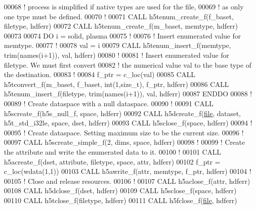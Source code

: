 \begin{DoxyCode}
00068   \textcolor{comment}{! process is simplified if native types are used for the file,}
00069   \textcolor{comment}{! as only one type must be defined.}
00070   \textcolor{comment}{!}
00071   \textcolor{keyword}{CALL }h5tenum\_create\_f(f\_baset, filetype, hdferr)
00072   \textcolor{keyword}{CALL }h5tenum\_create\_f(m\_baset, memtype, hdferr)
00073 
00074   \textcolor{keywordflow}{DO} i = solid, plasma
00075      \textcolor{comment}{!}
00076      \textcolor{comment}{! Insert enumerated value for memtype.}
00077      \textcolor{comment}{!}
00078      val = i
00079      \textcolor{keyword}{CALL }h5tenum\_insert\_f(memtype, trim(names(i+1)), val, hdferr)
00080      \textcolor{comment}{!}
00081      \textcolor{comment}{! Insert enumerated value for filetype.  We must first convert}
00082      \textcolor{comment}{! the numerical value val to the base type of the destination.}
00083      \textcolor{comment}{!}
00084      f\_ptr = c\_loc(val)
00085      \textcolor{keyword}{CALL }h5tconvert\_f(m\_baset, f\_baset, int(1,size\_t), f\_ptr, hdferr)
00086      \textcolor{keyword}{CALL }h5tenum\_insert\_f(filetype, trim(names(i+1)), val, hdferr)
00087 \textcolor{keywordflow}{  ENDDO}
00088   \textcolor{comment}{!}
00089   \textcolor{comment}{! Create dataspace with a null dataspace.}
00090   \textcolor{comment}{!}
00091   \textcolor{keyword}{CALL }h5screate\_f(h5s\_null\_f, space, hdferr)
00092   \textcolor{keyword}{CALL }h5dcreate\_f(\hyperlink{structfile}{file}, dataset, h5t\_std\_i32le, space, dset, hdferr)
00093   \textcolor{keyword}{CALL }h5sclose\_f(space, hdferr)
00094   \textcolor{comment}{!}
00095   \textcolor{comment}{! Create dataspace.  Setting maximum size to be the current size.}
00096   \textcolor{comment}{!}
00097   \textcolor{keyword}{CALL }h5screate\_simple\_f(2, dims, space, hdferr)
00098   \textcolor{comment}{!}
00099   \textcolor{comment}{! Create the attribute and write the enumerated data to it.}
00100   \textcolor{comment}{!}
00101   \textcolor{keyword}{CALL }h5acreate\_f(dset, attribute, filetype, space, attr, hdferr)
00102   f\_ptr = c\_loc(wdata(1,1))
00103   \textcolor{keyword}{CALL }h5awrite\_f(attr, memtype, f\_ptr, hdferr)
00104   \textcolor{comment}{!}
00105   \textcolor{comment}{! Close and release resources.}
00106   \textcolor{comment}{!}
00107   \textcolor{keyword}{CALL }h5aclose\_f(attr, hdferr)
00108   \textcolor{keyword}{CALL }h5dclose\_f(dset, hdferr)
00109   \textcolor{keyword}{CALL }h5sclose\_f(space, hdferr)
00110   \textcolor{keyword}{CALL }h5tclose\_f(filetype, hdferr)
00111   \textcolor{keyword}{CALL }h5fclose\_f(\hyperlink{structfile}{file}, hdferr)

\end{DoxyCode}
